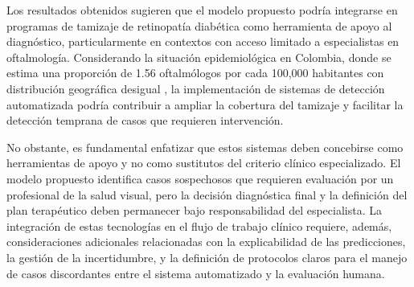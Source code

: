 Los resultados obtenidos sugieren que el modelo propuesto podría integrarse en programas
de tamizaje de retinopatía diabética como herramienta de apoyo al diagnóstico,
particularmente en contextos con acceso limitado a especialistas en oftalmología.
Considerando la situación epidemiológica en Colombia, donde se estima una proporción de
1.56 oftalmólogos por cada 100{,}000 habitantes con distribución geográfica desigual
, la implementación de sistemas de detección automatizada podría
contribuir a ampliar la cobertura del tamizaje y facilitar la detección temprana de casos
que requieren intervención.

No obstante, es fundamental enfatizar que estos sistemas deben concebirse como
herramientas de apoyo y no como sustitutos del criterio clínico especializado. El modelo
propuesto identifica casos sospechosos que requieren evaluación por un profesional de la
salud visual, pero la decisión diagnóstica final y la definición del plan terapéutico
deben permanecer bajo responsabilidad del especialista. La integración de estas
tecnologías en el flujo de trabajo clínico requiere, además, consideraciones adicionales
relacionadas con la explicabilidad de las predicciones, la gestión de la incertidumbre, y
la definición de protocolos claros para el manejo de casos discordantes entre el sistema
automatizado y la evaluación humana.
